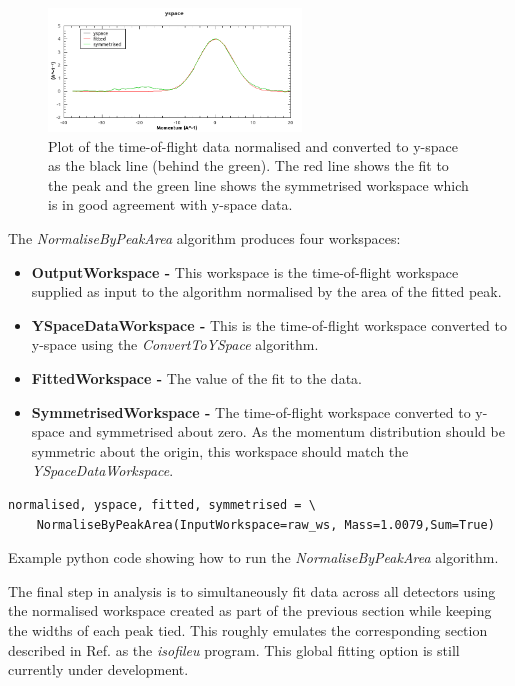 \documentclass[paper=a4, fontsize=11pt]{scrartcl}	%
\numberwithin{equation}{section}															%
\numberwithin{figure}{section}																%
\numberwithin{table}{section}
\begin{document}
\begin{figure}[H]
\centering
\includegraphics[width=0.6\textwidth]{img/yspace-norm.png}
\caption{Plot of the time-of-flight data normalised and converted to y-space as the black line (behind the green). The red line shows the fit to the peak and the green line shows the symmetrised workspace which is in good agreement with y-space data.}
\label{fig:yspace-norm}
\end{figure}

The \textit{NormaliseByPeakArea} algorithm produces four workspaces:

\begin{itemize}
\item \textbf{OutputWorkspace - } This workspace is the time-of-flight workspace supplied as input to the algorithm normalised by the area of the fitted peak.
\item \textbf{YSpaceDataWorkspace - } This is the time-of-flight workspace converted to y-space using the \textit{ConvertToYSpace} algorithm.
\item \textbf{FittedWorkspace - } The value of the fit to the data.
\item \textbf{SymmetrisedWorkspace - } The time-of-flight workspace converted to y-space and symmetrised about zero. As the momentum distribution should be symmetric about the origin, this workspace should match the \textit{YSpaceDataWorkspace}.
\end{itemize}

\begin{listing}[H]
\begin{verbatim}
normalised, yspace, fitted, symmetrised = \
	NormaliseByPeakArea(InputWorkspace=raw_ws, Mass=1.0079,Sum=True)
\end{verbatim}
\caption{Example python code showing how to run the \textit{NormaliseByPeakArea} algorithm.}
\label{lst:plot-angle}
\end{listing}

The final step in analysis is to simultaneously fit data across all detectors using the normalised workspace created as part of the previous section while keeping the widths of each peak tied. This roughly emulates the corresponding section described in Ref. \cite{mayers2010user} as the \textit{isofileu} program. This global fitting option is still currently under development.
\end{document}

